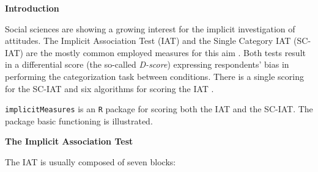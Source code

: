 \documentclass[a0,landscape]{a0poster}
\begin{document}
\begin{multicols*}{3}

\begin{center}
	\huge \textbf{\textcolor{title}{Introduction}}
\end{center}

\vspace{5mm}
\large

Social sciences are showing a growing interest for the implicit investigation of attitudes. The Implicit Association Test (IAT) \cite{Greenwald1998} and the Single Category IAT (SC-IAT) \cite{karpinski2006} are the mostly common employed measures for this aim \cite{review}.
Both tests result in a differential score (the so-called \emph{D-score}) expressing respondents’ bias in performing the categorization task between conditions. There is a single scoring for the SC-IAT \cite{karpinski2006} and six algorithms for scoring the IAT \cite{Greenwald2003}.

\texttt{implicitMeasures} is an \texttt{R} package for scoring both the IAT and the SC-IAT. The package basic functioning is illustrated. 

\vspace{5mm}
\begin{center}
	\Large \textbf{\textcolor{title}{The Implicit Association Test}}
\end{center}
\vspace{5mm}

The IAT is usually composed of seven blocks:


\end{multicols*}
\end{document}
